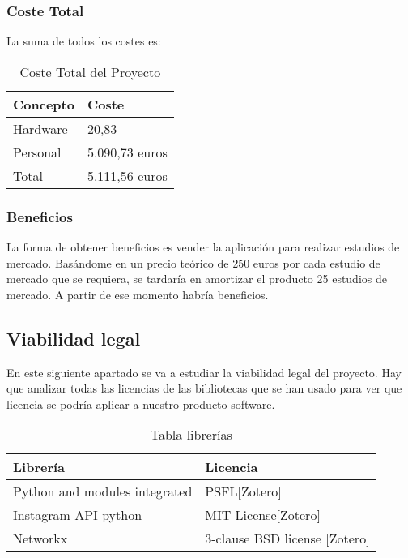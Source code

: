 \subsubsection{Coste Total}
La suma de todos los costes es:

\begin{table}[!h]
	\centering
	\begin{tabular}{@{}l|l@{}}
		\toprule
		Concepto & Coste  \\
		\midrule
		Hardware & 20,83 \\
		Personal & 5.090,73 euros \\
		\midrule
		Total & 5.111,56 euros \\
		\bottomrule
	\end{tabular}
	\caption{Coste Total del Proyecto}
	\label{tab:costeTotal}
\end{table}

\subsubsection{Beneficios}

La forma de obtener beneficios es vender la aplicación para realizar estudios de mercado. Basándome en un precio teórico de 250 euros por cada estudio de mercado que se requiera, se tardaría en amortizar el producto 25 estudios de mercado. A partir de ese momento habría beneficios.


\subsection{Viabilidad legal}

En este siguiente apartado se va a estudiar la viabilidad legal del proyecto. Hay que analizar todas las licencias de las bibliotecas que se han usado para ver que licencia se podría aplicar a nuestro producto software.

\begin{table}[!h]
	\centering
	\begin{tabular}{@{}l|l@{}}
		\toprule
		Librería & Licencia  \\
		\midrule
		Python and modules integrated & PSFL[Zotero] \\
		Instagram-API-python & MIT License[Zotero] \\
		Networkx & 3-clause BSD license [Zotero] \\
		\bottomrule
	\end{tabular}
	\caption{Tabla librerías}
	\label{tab:librerias}
\end{table}

